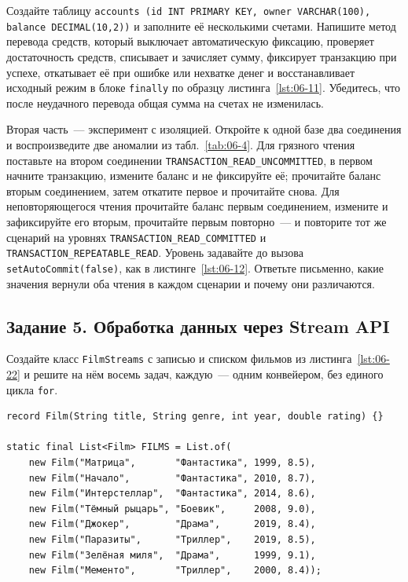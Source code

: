 Создайте таблицу
\texttt{accounts (id INT PRIMARY KEY, owner VARCHAR(100), balance DECIMAL(10,2))}
и заполните её несколькими счетами. Напишите метод перевода средств, который
выключает автоматическую фиксацию, проверяет достаточность средств, списывает
и зачисляет сумму, фиксирует транзакцию при успехе, откатывает её при ошибке
или нехватке денег и восстанавливает исходный режим в блоке \texttt{finally}
по образцу листинга~\ref{lst:06-11}. Убедитесь, что после неудачного перевода
общая сумма на счетах не изменилась.

Вторая часть~--- эксперимент с изоляцией. Откройте к одной базе два соединения
и воспроизведите две аномалии из табл.~\ref{tab:06-4}. Для грязного чтения
поставьте на втором соединении \texttt{TRANSACTION\_READ\_UNCOMMITTED}, в
первом начните транзакцию, измените баланс и не фиксируйте её; прочитайте
баланс вторым соединением, затем откатите первое и прочитайте снова. Для
неповторяющегося чтения прочитайте баланс первым соединением, измените и
зафиксируйте его вторым, прочитайте первым повторно~--- и повторите тот же
сценарий на уровнях \texttt{TRANSACTION\_READ\_COMMITTED} и
\texttt{TRANSACTION\_REPEATABLE\_READ}. Уровень задавайте до вызова
\texttt{setAutoCommit(false)}, как в листинге~\ref{lst:06-12}. Ответьте
письменно, какие значения вернули оба чтения в каждом сценарии и почему они
различаются.

\subsection*{Задание 5. Обработка данных через Stream API}

Создайте класс \texttt{FilmStreams} с записью и списком фильмов из
листинга~\ref{lst:06-22} и решите на нём восемь задач, каждую~--- одним
конвейером, без единого цикла \texttt{for}.

\begin{listing}[H]
\begin{verbatim}
record Film(String title, String genre, int year, double rating) {}

static final List<Film> FILMS = List.of(
    new Film("Матрица",       "Фантастика", 1999, 8.5),
    new Film("Начало",        "Фантастика", 2010, 8.7),
    new Film("Интерстеллар",  "Фантастика", 2014, 8.6),
    new Film("Тёмный рыцарь", "Боевик",     2008, 9.0),
    new Film("Джокер",        "Драма",      2019, 8.4),
    new Film("Паразиты",      "Триллер",    2019, 8.5),
    new Film("Зелёная миля",  "Драма",      1999, 9.1),
    new Film("Мементо",       "Триллер",    2000, 8.4));
\end{verbatim}
\caption{Исходные данные для заданий по Stream API}
\label{lst:06-22}
\end{listing}

